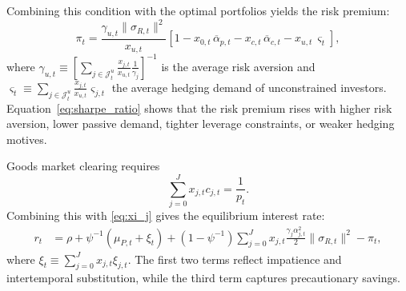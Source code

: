 Combining this condition with the optimal portfolios yields the risk premium:
\begin{equation}\label{eq:sharpe_ratio}
    \pi_t = \frac{\gamma_{u,t} \|\sigma_{R,t}\|^2}{x_{u,t}}
    \left[ 1 - x_{0,t}\, \overline{\alpha}_{p,t} 
    - x_{c,t}\, \overline{\alpha}_{c,t} 
    - x_{u,t}\, \varsigma_t \right],
\end{equation}
where $\gamma_{u,t} \equiv [\sum_{j\in\mathcal{J}_t^u} \frac{x_{j,t}}{x_{u,t}} \frac{1}{\gamma_j}]^{-1}$ is the average risk aversion and $\varsigma_t \equiv \sum_{j\in \mathcal{J}_t^u} \frac{x_{j,t}}{x_{u,t}} \varsigma_{j,t}$ the average hedging demand of unconstrained investors.  
Equation~\eqref{eq:sharpe_ratio} shows that the risk premium rises with higher risk aversion, lower passive demand, tighter leverage constraints, or weaker hedging motives.

Goods market clearing requires
\begin{equation}
    \sum_{j=0}^J x_{j,t} c_{j,t} = \frac{1}{p_t}.
\end{equation}
Combining this with \eqref{eq:xi_j} gives the equilibrium interest rate:
\begin{align}\label{eq:interest_rate}
    r_t &= \rho + \psi^{-1} (\mu_{P,t} + \xi_t )
    + (1-\psi^{-1}) \sum_{j=0}^J x_{j,t} 
        \frac{\gamma_j \alpha_{j,t}^2}{2} \|\sigma_{R,t}\|^2
    - \pi_t,
\end{align}
where $\xi_t \equiv \sum_{j=0}^J x_{j,t} \xi_{j,t}$.  
The first two terms reflect impatience and intertemporal substitution, while the third term captures precautionary savings.



